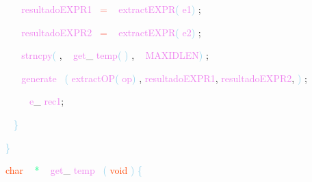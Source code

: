 \documentclass[8, usernames, dvipsnames]{beamer}
\begin{document}
\begin{frame}
\textcolor{White}{\   }
\textcolor{White}{\   }
\textcolor{Violet}{resultadoEXPR1}\textcolor{White}{\ }
\textcolor{Salmon}{=}
\textcolor{White}{\ }
\textcolor{Violet}{extractEXPR}\textcolor{SkyBlue}{(}
\textcolor{Violet}{e1}\textcolor{SkyBlue}{)}
\textcolor{Sepia}{;}

 \textcolor{White}{\   }
\textcolor{White}{\   }
\textcolor{Violet}{resultadoEXPR2}\textcolor{White}{\ }
\textcolor{Salmon}{=}
\textcolor{White}{\ }
\textcolor{Violet}{extractEXPR}\textcolor{SkyBlue}{(}
\textcolor{Violet}{e2}\textcolor{SkyBlue}{)}
\textcolor{Sepia}{;}

 \textcolor{White}{\   }
\textcolor{White}{\   }
\textcolor{Violet}{strncpy}\textcolor{SkyBlue}{(}
\textcolor{Sepia}{,}
\textcolor{White}{\ }
\textcolor{Violet}{get}\textcolor{Sepia}{\_}
\textcolor{Violet}{temp}\textcolor{SkyBlue}{(}
\textcolor{SkyBlue}{)}
\textcolor{Sepia}{,}
\textcolor{White}{\ }
\textcolor{Violet}{MAXIDLEN}\textcolor{SkyBlue}{)}
\textcolor{Sepia}{;}

 \textcolor{White}{\   }
\textcolor{White}{\   }
\textcolor{Violet}{generate}\textcolor{White}{\ }
\textcolor{SkyBlue}{(}
\textcolor{Violet}{extractOP}\textcolor{SkyBlue}{(}
\textcolor{Violet}{op}\textcolor{SkyBlue}{)}
\textcolor{Sepia}{,}
\textcolor{Violet}{resultadoEXPR1}\textcolor{Sepia}{,}
\textcolor{Violet}{resultadoEXPR2}\textcolor{Sepia}{,}
\textcolor{SkyBlue}{)}
\textcolor{Sepia}{;}

 \textcolor{White}{\   }
\textcolor{White}{\   }
\textcolor{OrangeRed}{	}
\textcolor{White}{\ }
\textcolor{Violet}{e}\textcolor{Sepia}{\_}
\textcolor{Violet}{rec1}\textcolor{Sepia}{;}

 \textcolor{White}{\   }
\textcolor{SkyBlue}{\} }

 \textcolor{SkyBlue}{\} }

 
 \textcolor{OrangeRed}{char}
\textcolor{White}{\ }
\textcolor{SpringGreen}{*}
\textcolor{White}{\ }
\textcolor{Violet}{get}\textcolor{Sepia}{\_}
\textcolor{Violet}{temp}\textcolor{White}{\ }
\textcolor{SkyBlue}{(}
\textcolor{OrangeRed}{void}
\textcolor{SkyBlue}{)}
\textcolor{SkyBlue}{\{ }

 
 \end{frame}
\end{document}
